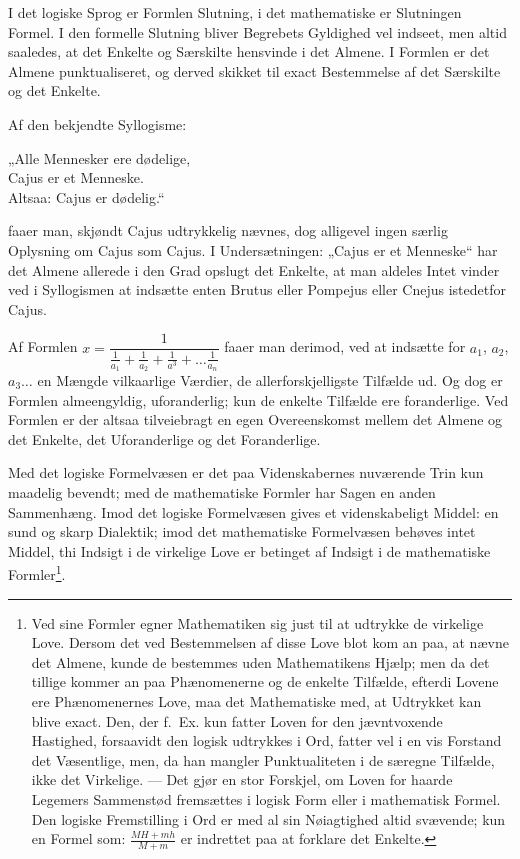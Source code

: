 \documentclass[12pt]{book}
\newcommand{\opage}[1]{\marginnote{\footnotesize\textit{[#1]}}}
\begin{document}
I det logiske Sprog er Formlen Slutning, i det mathematiske er Slutningen Formel.
I den formelle Slutning bliver Begrebets Gyldighed vel indseet, men altid
saaledes, at det Enkelte og Særskilte hensvinde i det Almene. I Formlen er det
Almene punktualiseret, og derved skikket til exact Bestemmelse af det Særskilte
og det Enkelte.

Af den bekjendte Syllogisme:
\begin{center}
„Alle Mennesker ere dødelige,\\
Cajus er et Menneske.\\
Altsaa: Cajus er dødelig.“
\end{center}
faaer man, skjøndt Cajus udtrykkelig nævnes, dog alligevel ingen særlig
Oplysning om Cajus som Cajus. I Undersætningen: „Cajus er et Menneske“ har det
Almene allerede i den Grad opslugt det Enkelte, at man aldeles Intet vinder ved i
Syllogismen at indsætte enten Brutus eller Pompejus eller Cnejus istedetfor
Cajus.

Af Formlen $x = \dfrac{1}{\frac{1}{a_1}+\frac{1}{a_2}+\frac{1}{a^{3}}+\dots
\frac{1}{a_n}}$ faaer man derimod, ved at indsætte for $a_1$, $a_2$, $a_3\dots$
en Mængde vilkaarlige Værdier, de allerforskjelligste Tilfælde ud. Og dog er
Formlen almeengyldig, uforanderlig; kun de enkelte Tilfælde ere foranderlige.
Ved Formlen er der altsaa tilveiebragt en egen Overeenskomst mellem det Almene og
det Enkelte, det Uforanderlige og det Foranderlige.

Med det logiske Formelvæsen er det paa Videnskabernes nuværende Trin kun maadelig
bevendt; med de mathematiske Formler har Sagen en anden Sammenhæng.
\opage{15} Imod det logiske Formelvæsen gives et videnskabeligt Middel: en sund og skarp
Dialektik; imod det mathematiske Formelvæsen behøves intet Middel, thi Indsigt i
de virkelige Love er betinget af Indsigt i de mathematiske Formler\footnote{Ved
sine Formler egner Mathematiken sig just til at udtrykke de virkelige Love.
Dersom det ved Bestemmelsen af disse Love blot kom an paa, at nævne det Almene,
kunde de bestemmes uden Mathematikens Hjælp; men da det tillige kommer an paa
Phænomenerne og de enkelte Tilfælde, efterdi Lovene ere Phænomenernes Love, maa
det Mathematiske med, at Udtrykket kan blive exact. Den, der f.\ Ex. kun fatter
Loven for den jævntvoxende Hastighed, forsaavidt den logisk udtrykkes i Ord,
fatter vel i en vis Forstand det Væsentlige, men, da han mangler Punktualiteten i
de særegne Tilfælde, ikke det Virkelige. --- Det gjør en stor Forskjel, om Loven
for haarde Legemers Sammenstød fremsættes i logisk Form eller i mathematisk
Formel. Den logiske Fremstilling i Ord er med al sin Nøiagtighed altid svævende;
kun en Formel som: $\frac{MH+mh}{M+m}$ er indrettet paa at forklare det Enkelte.}.
\end{document}
